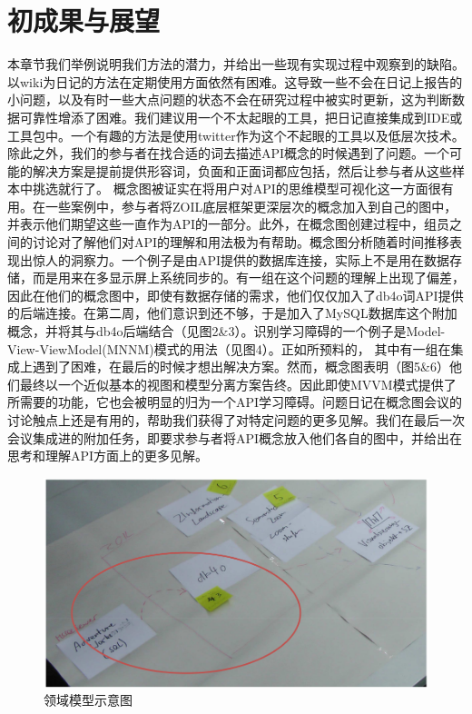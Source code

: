 \section*{初成果与展望}
本章节我们举例说明我们方法的潜力，并给出一些现有实现过程中观察到的缺陷。
以wiki为日记的方法在定期使用方面依然有困难。这导致一些不会在日记上报告的小问题，以及有时一些大点问题的状态不会在研究过程中被实时更新，这为判断数据可靠性增添了困难。我们建议用一个不太起眼的工具，把日记直接集成到IDE或工具包中。一个有趣的方法是使用twitter作为这个不起眼的工具以及低层次技术。除此之外，我们的参与者在找合适的词去描述API概念的时候遇到了问题。一个可能的解决方案是提前提供形容词，负面和正面词都应包括，然后让参与者从这些样本中挑选就行了。
概念图被证实在将用户对API的思维模型可视化这一方面很有用。在一些案例中，参与者将ZOIL底层框架更深层次的概念加入到自己的图中，并表示他们期望这些一直作为API的一部分。此外，在概念图创建过程中，组员之间的讨论对了解他们对API的理解和用法极为有帮助。概念图分析随着时间推移表现出惊人的洞察力。一个例子是由API提供的数据库连接，实际上不是用在数据存储，而是用来在多显示屏上系统同步的。有一组在这个问题的理解上出现了偏差，因此在他们的概念图中，即使有数据存储的需求，他们仅仅加入了db4o词API提供的后端连接。在第二周，他们意识到还不够，于是加入了MySQL数据库这个附加概念，并将其与db4o后端结合（见图2\&3）。识别学习障碍的一个例子是Model-View-ViewModel(MNNM)模式的用法（见图4）。正如所预料的， 其中有一组在集成上遇到了困难，在最后的时候才想出解决方案。然而，概念图表明（图5\&6）他们最终以一个近似基本的视图和模型分离方案告终。因此即使MVVM模式提供了所需要的功能，它也会被明显的归为一个API学习障碍。问题日记在概念图会议的讨论触点上还是有用的，帮助我们获得了对特定问题的更多见解。我们在最后一次会议集成进的附加任务，即要求参与者将API概念放入他们各自的图中，并给出在思考和理解API方面上的更多见解。
\begin{figure}[!hbp]
  \begin{center}
    \includegraphics[scale=0.3]{figures/translation/translation_api_fig2.png}
    领域模型示意图
  \end{center}
\end{figure}

